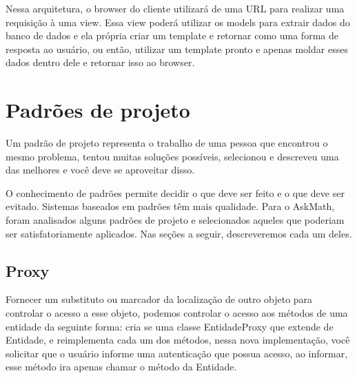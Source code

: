 \begin{figure}[h!]
	\centering
\end{figure}


Nessa arquitetura, o browser do cliente utilizar\'a de uma URL para realizar uma 
requisição \`a uma view. Essa view poder\'a utilizar os models para extrair dados do 
banco de dados e ela própria criar um template e retornar como uma forma 
de resposta ao usuário, ou então, utilizar um template pronto e apenas 
moldar esses dados dentro dele e retornar isso ao browser. 

\section{Padrões de projeto}
Um padrão de projeto representa o trabalho de uma pessoa que encontrou o mesmo 
problema, tentou muitas soluções possíveis, selecionou e descreveu uma das 
melhores e você deve se aproveitar disso.

O conhecimento de padrões permite decidir o que deve ser feito e o que deve ser 
evitado. Sistemas baseados em padrões têm mais qualidade. Para o AskMath, foram analisados alguns padrões  de projeto e selecionados aqueles que poderiam ser satisfatoriamente aplicados. Nas 
se\c{c}\~oes a seguir, descreveremos cada um deles.

\subsection{Proxy}
Fornecer um substituto ou marcador da localização de outro objeto para controlar 
o acesso a esse objeto, podemos controlar o acesso aos métodos de uma entidade 
da seguinte forma: cria se uma classe EntidadeProxy que extende de Entidade, e 
reimplementa cada um dos métodos, nessa nova implementação, você solicitar que o 
usuário informe uma autenticação que possua acesso, ao informar, esse método ira 
apenas chamar o método da Entidade.   

